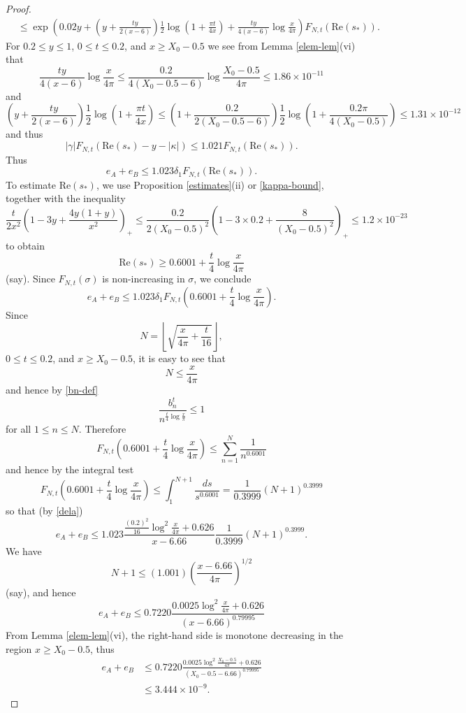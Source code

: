\begin{proof}
\begin{align*}
&\leq \exp\left( 0.02 y + \left(y + \frac{ty}{2(x-6)}\right) \frac{1}{2} \log(1 + \frac{\pi t}{4x}) + \frac{ty}{4(x-6)} \log \frac{x}{4\pi} \right) F_{N,t}( \mathrm{Re}(s_*) ).
\end{align*}
For $0.2 \leq y \leq 1$, $0 \leq t \leq 0.2$, and $x \geq X_0 - 0.5$ we see from Lemma \ref{elem-lem}(vi) that
$$ \frac{ty}{4(x-6)} \log \frac{x}{4\pi} \leq \frac{0.2}{4(X_0 - 0.5-6)}\log \frac{X_0 - 0.5}{4\pi} \leq 1.86 \times 10^{-11}$$
and
$$ \left(y + \frac{ty}{2(x-6)}\right) \frac{1}{2} \log(1 + \frac{\pi t}{4x}) \leq \left(1 + \frac{0.2}{2(X_0-0.5-6)}\right) \frac{1}{2} \log\left(1 + \frac{0.2 \pi}{4(X_0-0.5)}\right) \leq 1.31 \times 10^{-12}$$
and thus
\begin{equation}\label{gafn}
 |\gamma| F_{N,t}( \mathrm{Re}(s_*) - y - |\kappa| ) \leq 1.021  F_{N,t}( \mathrm{Re}(s_*) ).
\end{equation}
Thus
$$  e_A + e_B \leq 1.023 \delta_1 F_{N,t}( \mathrm{Re}(s_*) ).$$
To estimate $\mathrm{Re}(s_*)$, we use Proposition \ref{estimates}(ii) or \eqref{kappa-bound}, together with the inequality
$$ \frac{t}{2x^2} \left(1-3y+\frac{4y(1+y)}{x^2}\right)_+ \leq \frac{0.2}{2 (X_0-0.5)^2} \left(1 - 3 \times 0.2 + \frac{8}{(X_0-0.5)^2}\right)_+
\leq 1.2 \times 10^{-23}$$
to obtain 
$$ \mathrm{Re}(s_*) \geq 0.6001 + \frac{t}{4} \log \frac{x}{4\pi}$$
(say).  Since $F_{N,t}(\sigma)$ is non-increasing in $\sigma$, we conclude
$$  e_A + e_B \leq 1.023 \delta_1 F_{N,t}\left( 0.6001 + \frac{t}{4} \log \frac{x}{4\pi} \right).$$
Since
$$ N = \left\lfloor \sqrt{\frac{x}{4\pi} + \frac{t}{16}} \right\rfloor,$$
$0 \leq t \leq 0.2$, and $x \geq X_0-0.5$, it is easy to see that
$$ N \leq \frac{x}{4\pi}$$
and hence by \eqref{bn-def}
$$ \frac{b_n^t}{n^{\frac{t}{4} \log \frac{x}{\pi}}} \leq 1$$
for all $1 \leq n \leq N$.  Therefore
$$ F_{N,t}\left( 0.6001 + \frac{t}{4} \log \frac{x}{4\pi} \right) \leq \sum_{n=1}^N \frac{1}{n^{0.6001}}$$
and hence by the integral test
$$ F_{N,t}\left( 0.6001 + \frac{t}{4} \log \frac{x}{4\pi} \right) \leq \int_1^{N+1} \frac{ds}{s^{0.6001}} = \frac{1}{0.3999} (N+1)^{0.3999} $$
so that (by \eqref{dela})
$$ e_A + e_B \leq 1.023 \frac{\frac{(0.2)^2}{16} \log^2 \frac{x}{4\pi} + 0.626}{x-6.66} \frac{1}{0.3999} (N+1)^{0.3999}.$$
We have
$$ N+1 \leq (1.001) \left(\frac{x-6.66}{4\pi}\right)^{1/2} $$
(say), and hence
$$ e_A + e_B \leq 0.7220 \frac{0.0025 \log^2 \frac{x}{4\pi} + 0.626}{(x-6.66)^{0.79995}}$$
From Lemma \ref{elem-lem}(vi), the right-hand side is monotone decreasing in the region $x \geq X_0-0.5$, thus
\begin{align*}
 e_A + e_B &\leq 0.7220 \frac{0.0025 \log^2 \frac{X_0-0.5}{4\pi} + 0.626}{(X_0-0.5-6.66)^{0.79995}} \\
&\leq 3.444 \times 10^{-9}.
\end{align*}


\end{proof}
